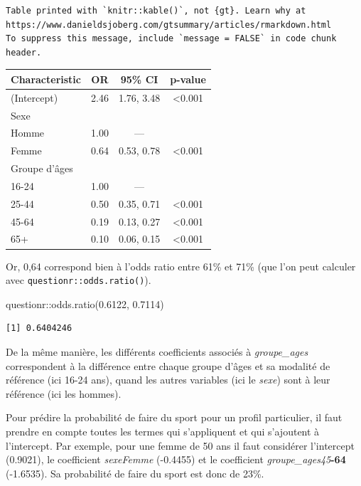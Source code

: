 \documentclass[
  letterpaper,
  DIV=11,
  numbers=noendperiod,
  oneside]{scrreprt}
\newenvironment{Shaded}{\begin{snugshade}}{\end{snugshade}}
\newcommand{\FloatTok}[1]{\textcolor[rgb]{0.68,0.00,0.00}{#1}}
\newcommand{\FunctionTok}[1]{\textcolor[rgb]{0.28,0.35,0.67}{#1}}
\newcommand{\NormalTok}[1]{\textcolor[rgb]{0.00,0.23,0.31}{#1}}
\newcommand{\SpecialCharTok}[1]{\textcolor[rgb]{0.37,0.37,0.37}{#1}}
\begin{document}
\begin{verbatim}
Table printed with `knitr::kable()`, not {gt}. Learn why at
https://www.danieldsjoberg.com/gtsummary/articles/rmarkdown.html
To suppress this message, include `message = FALSE` in code chunk header.
\end{verbatim}

\begin{longtable}[]{@{}lccc@{}}
\toprule()
\textbf{Characteristic} & \textbf{OR} & \textbf{95\% CI} &
\textbf{p-value} \\
\midrule()
\endhead
(Intercept) & 2.46 & 1.76, 3.48 & \textless0.001 \\
Sexe & & & \\
Homme & 1.00 & --- & \\
Femme & 0.64 & 0.53, 0.78 & \textless0.001 \\
Groupe d'âges & & & \\
16-24 & 1.00 & --- & \\
25-44 & 0.50 & 0.35, 0.71 & \textless0.001 \\
45-64 & 0.19 & 0.13, 0.27 & \textless0.001 \\
65+ & 0.10 & 0.06, 0.15 & \textless0.001 \\
\bottomrule()
\end{longtable}

Or, 0,64 correspond bien à l'odds ratio entre 61\% et 71\% (que l'on
peut calculer avec \texttt{questionr::odds.ratio()}).

\begin{Shaded}
\begin{Highlighting}[]
\NormalTok{questionr}\SpecialCharTok{::}\FunctionTok{odds.ratio}\NormalTok{(}\FloatTok{0.6122}\NormalTok{, }\FloatTok{0.7114}\NormalTok{)}
\end{Highlighting}
\end{Shaded}

\begin{verbatim}
[1] 0.6404246
\end{verbatim}

De la même manière, les différents coefficients associés à
\emph{groupe\_ages} correspondent à la différence entre chaque groupe
d'âges et sa modalité de référence (ici 16-24 ans), quand les autres
variables (ici le \emph{sexe}) sont à leur référence (ici les hommes).

Pour prédire la probabilité de faire du sport pour un profil
particulier, il faut prendre en compte toutes les termes qui
s'appliquent et qui s'ajoutent à l'intercept. Par exemple, pour une
femme de 50 ans il faut considérer l'intercept (0.9021), le coefficient
\emph{sexeFemme} (-0.4455) et le coefficient
\emph{groupe\_ages45}\textbf{-64} (-1.6535). Sa probabilité de faire du
sport est donc de 23\%.
\end{document}
